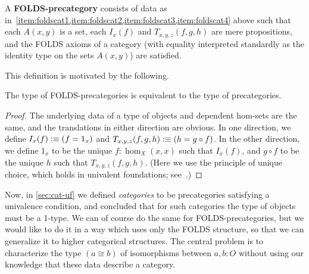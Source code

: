 \documentclass{amsart}
\begin{document}
\begin{defn}
  A \textbf{FOLDS-precategory} consists of data as in~\autoref{item:foldscat1,item:foldscat2,item:foldscat3,item:foldscat4} above such that each $A(x,y)$ is a set, each $I_x(f)$ and $T_{x,y,z}(f,g,h)$ are mere propositions, and the FOLDS axioms of a category (with equality interpreted standardly as the identity type on the sets $A(x,y)$) are satisfied.
\end{defn}

This definition is motivated by the following.

\begin{lem}
  The type of FOLDS-precategories is equivalent to the type of precategories.
\end{lem}
\begin{proof}
  The underlying data of a type of objects and dependent hom-sets are the same, and the translations in either direction are obvious.
  In one direction, we define $I_x(f) \vcentcolon\equiv (f = 1_x)$ and $T_{x,y,z}(f,g,h) \vcentcolon\equiv (h = g\circ f)$.
  In the other direction, we define $1_x$ to be the unique $f:\hom_X(x,x)$ such that $I_x(f)$, and $g\circ f$ to be the unique $h$ such that $T_{x,y,z}(f,g,h)$.
  (Here we use the principle of unique choice, which holds in univalent foundations; see~\cite[\S3.9]{hottbook}.)
\end{proof}

Now, in \autoref{sec:cat-uf} we defined \emph{categories} to be precategories satisfying a univalence condition, and concluded that for such categories the type of objects must be a 1-type.
We can of course do the same for FOLDS-precategories, but we would like to do it in a way which uses only the FOLDS structure, so that we can generalize it to higher categorical structures.
The central problem is to characterize the type $(a\cong b)$ of isomorphisms between $a,b:O$ without using our knowledge that these data describe a category.
\end{document}
